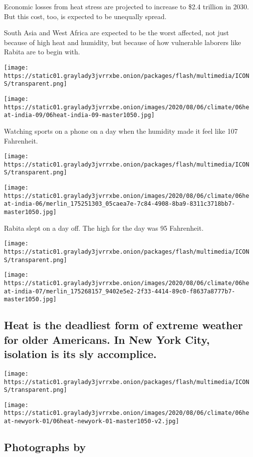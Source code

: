 Economic losses from heat stress are projected to increase to \$2.4
trillion in 2030. But this cost, too, is expected to be unequally
spread.

South Asia and West Africa are expected to be the worst affected, not
just because of high heat and humidity, but because of how vulnerable
laborers like Rabita are to begin with.

\texttt{[image: https://static01.graylady3jvrrxbe.onion/packages/flash/multimedia/ICONS/transparent.png]}

\texttt{[image: https://static01.graylady3jvrrxbe.onion/images/2020/08/06/climate/06heat-india-09/06heat-india-09-master1050.jpg]}

Watching sports on a phone on a day when the humidity made it feel like
107 Fahrenheit.

\texttt{[image: https://static01.graylady3jvrrxbe.onion/packages/flash/multimedia/ICONS/transparent.png]}

\texttt{[image: https://static01.graylady3jvrrxbe.onion/images/2020/08/06/climate/06heat-india-06/merlin\_175251303\_05caea7e-7c84-4908-8ba9-8311c3718bb7-master1050.jpg]}

Rabita slept on a day off. The high for the day was 95 Fahrenheit.

\texttt{[image: https://static01.graylady3jvrrxbe.onion/packages/flash/multimedia/ICONS/transparent.png]}

\texttt{[image: https://static01.graylady3jvrrxbe.onion/images/2020/08/06/climate/06heat-india-07/merlin\_175268157\_9402e5e2-2f33-4414-89c0-f8637a8777b7-master1050.jpg]}

\hypertarget{heat-is-the-deadliest-form-of-extreme-weather-for-older-americans-in-new-york-city-isolation-is-its-sly-accomplice}{%
\subsection{Heat is the deadliest form of extreme weather for older
Americans. In New York City, isolation is its sly
accomplice.}\label{heat-is-the-deadliest-form-of-extreme-weather-for-older-americans-in-new-york-city-isolation-is-its-sly-accomplice}}

\texttt{[image: https://static01.graylady3jvrrxbe.onion/packages/flash/multimedia/ICONS/transparent.png]}

\texttt{[image: https://static01.graylady3jvrrxbe.onion/images/2020/08/06/climate/06heat-newyork-01/06heat-newyork-01-master1050-v2.jpg]}

\hypertarget{photographs-by-5}{%
\subsection{Photographs by}\label{photographs-by-5}}

